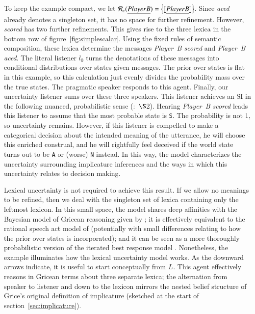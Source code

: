 \documentclass[leqno,12pt]{article}
\newcommand{\secref}[1]{section~\ref{#1}}
\newcommand{\figref}[1]{figure~\ref{#1}}
\newcommand{\seccitep}[2]{(\citealt{#1}:~$\S$#2)}
\newcommand{\word}[1]{\emph{#1}}
\newcommand{\set}[1]{\ensuremath{\left\{ #1 \right\}}}
\newcommand{\sem}[1]{\ensuremath{\llbracket#1\rrbracket}}
\newcommand{\listenerZero}{l_{0}}
\newcommand{\UncertaintyListener}[1][]{L_{#1}}
\newcommand{\Refine}[1][c]{\mathcal{R}_{#1}}
\newcommand{\world}[1]{\texttt{#1}}
\begin{document}
{To keep the example compact, we let
$\Refine(\word{Player B}) = \set{\sem{\word{Player B}}}$. Since
\word{aced} already denotes a singleton set, it has no space for
further refinement. However, \word{scored} has two further
refinements. This gives rise to the three lexica in the bottom row of
\figref{fig:simplescalar}.  Using the fixed rules of semantic
composition, these lexica determine the messages \word{Player~B
  scored} and \word{Player~B aced}. The literal listener
$\listenerZero$ turns the denotations of these messages into
conditional distributions over states given messages. The prior over
states is flat in this example, so this calculation just evenly
divides the probability mass over the true states. The pragmatic
speaker responds to this agent. Finally, our uncertainty listener sums
over these three speakers. This listener achieves an SI in the
following nuanced, probabilistic sense
\seccitep{Russell:2012}{2}. Hearing \word{Player~B scored} leads this
listener to assume that the most probable state is \world{S}. The
probability is not $1$, so uncertainty remains. However, if this
listener is compelled to make a categorical decision about the
intended meaning of the utterance, he will choose this enriched
construal, and he will rightfully feel deceived if the world state
turns out to be \world{A} or (worse) \world{N} instead. In this way,
the model characterizes the uncertainty surrounding implicature
inferences \citep{Hirschberg85} and the ways in which this uncertainty
relates to decision making.

Lexical uncertainty is not required to achieve this result. If we
allow no meanings to be refined, then we deal with the singleton set
of lexica containing only the leftmost lexicon. In this small space,
the model shares deep affinities with the Bayesian model of Gricean
reasoning given by \citet{Russell:2012}; it is effectively equivalent
to the rational speech act model of \citet{Frank:Goodman:2012}
(potentially with small differences relating to how the prior over
states is incorporated); and it can be seen as a more thoroughly
probabilistic version of the iterated best response model
\citep{Franke09DISS,Jaeger:2007,Jaeger:2011}. Nonetheless, the example
illuminates how the lexical uncertainty model works. As the downward
arrows indicate, it is useful to start conceptually from
$\UncertaintyListener$. This agent effectively reasons in Gricean
terms about three separate lexica; the alternation from speaker to
listener and down to the lexicon mirrors the nested belief structure
of Grice's original definition of implicature (sketched at the start
of \secref{sec:implicature}).

}
\end{document}
